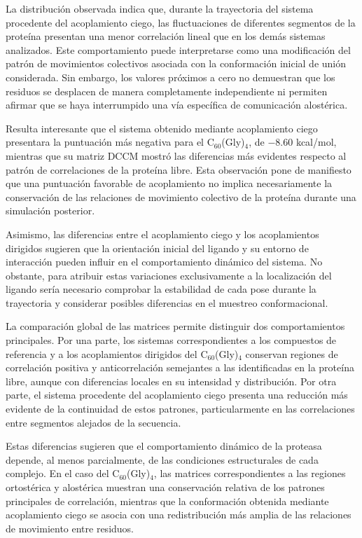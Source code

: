 La distribución observada indica que, durante la trayectoria del sistema procedente del acoplamiento ciego, las fluctuaciones de diferentes segmentos de la proteína presentan una menor correlación lineal que en los demás sistemas analizados. Este comportamiento puede interpretarse como una modificación del patrón de movimientos colectivos asociada con la conformación inicial de unión considerada. Sin embargo, los valores próximos a cero no demuestran que los residuos se desplacen de manera completamente independiente ni permiten afirmar que se haya interrumpido una vía específica de comunicación alostérica.

Resulta interesante que el sistema obtenido mediante acoplamiento ciego presentara la puntuación más negativa para el C$_{60}$(Gly)$_4$, de $-8.60$ kcal/mol, mientras que su matriz DCCM mostró las diferencias más evidentes respecto al patrón de correlaciones de la proteína libre. Esta observación pone de manifiesto que una puntuación favorable de acoplamiento no implica necesariamente la conservación de las relaciones de movimiento colectivo de la proteína durante una simulación posterior.

Asimismo, las diferencias entre el acoplamiento ciego y los acoplamientos dirigidos sugieren que la orientación inicial del ligando y su entorno de interacción pueden influir en el comportamiento dinámico del sistema. No obstante, para atribuir estas variaciones exclusivamente a la localización del ligando sería necesario comprobar la estabilidad de cada pose durante la trayectoria y considerar posibles diferencias en el muestreo conformacional.

La comparación global de las matrices permite distinguir dos comportamientos principales. Por una parte, los sistemas correspondientes a los compuestos de referencia y a los acoplamientos dirigidos del C$_{60}$(Gly)$_4$ conservan regiones de correlación positiva y anticorrelación semejantes a las identificadas en la proteína libre, aunque con diferencias locales en su intensidad y distribución. Por otra parte, el sistema procedente del acoplamiento ciego presenta una reducción más evidente de la continuidad de estos patrones, particularmente en las correlaciones entre segmentos alejados de la secuencia.

Estas diferencias sugieren que el comportamiento dinámico de la proteasa depende, al menos parcialmente, de las condiciones estructurales de cada complejo. En el caso del C$_{60}$(Gly)$_4$, las matrices correspondientes a las regiones ortostérica y alostérica muestran una conservación relativa de los patrones principales de correlación, mientras que la conformación obtenida mediante acoplamiento ciego se asocia con una redistribución más amplia de las relaciones de movimiento entre residuos.

